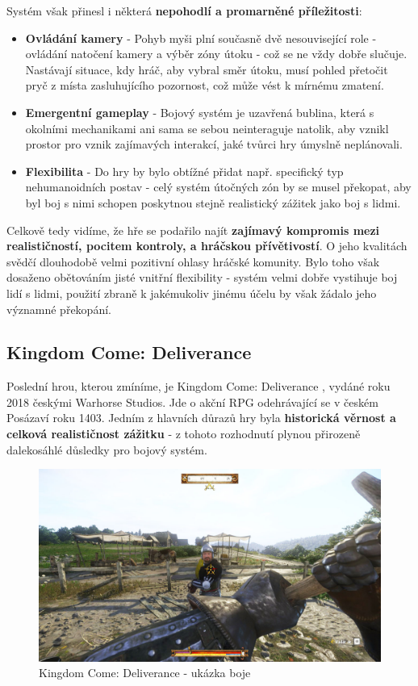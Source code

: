 Systém však přinesl i některá \textbf{nepohodlí a promarněné příležitosti}:
\begin{itemize}
    \item \textbf{Ovládání kamery} - Pohyb myši plní současně dvě nesouvisející role - ovládání natočení kamery a výběr zóny útoku - což se ne vždy dobře slučuje. Nastávají situace, kdy hráč, aby vybral směr útoku, musí pohled přetočit pryč z místa zasluhujícího pozornost, což může vést k mírnému zmatení.  
    \item \textbf{Emergentní gameplay} - Bojový systém je uzavřená bublina, která s okolními mechanikami ani sama se sebou neinteraguje natolik, aby vznikl prostor pro vznik zajímavých interakcí, jaké tvůrci hry úmyslně neplánovali.
    \item \textbf{Flexibilita} - Do hry by bylo obtížné přidat např. specifický typ nehumanoidních postav - celý systém útočných zón by se musel překopat, aby byl boj s nimi schopen poskytnou stejně realistický zážitek jako boj s lidmi.
\end{itemize}

Celkově tedy vidíme, že hře se podařilo najít \textbf{zajímavý kompromis mezi realističností, pocitem kontroly, a hráčskou přívětivostí}. O jeho kvalitách svědčí dlouhodobě velmi pozitivní ohlasy hráčské komunity. Bylo toho však dosaženo obětováním jisté vnitřní flexibility - systém velmi dobře vystihuje boj lidí s lidmi, použití zbraně k jakémukoliv jinému účelu by však žádalo jeho významné překopání. 


\subsection{Kingdom Come: Deliverance}
Poslední hrou, kterou zmíníme, je Kingdom Come: Deliverance \cite{KCD}, vydáné roku 2018 českými Warhorse Studios. Jde o akční \acs{RPG} odehrávající se v českém Posázaví roku 1403. Jedním z hlavních důrazů hry byla \textbf{historická věrnost a celková realističnost zážitku} - z tohoto rozhodnutí plynou přirozeně dalekosáhlé důsledky pro bojový systém.

\begin{figure}[ht]\centering
    \center
    \includegraphics[width=140mm]{../img/KCD-combat.jpg} 
    \caption{Kingdom Come: Deliverance - ukázka boje}
    \label{obr01:kcd}
\end{figure} 


